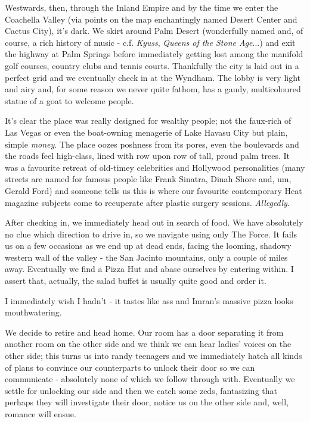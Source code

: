 \documentclass[a5paper,titlepage,11pt]{book}
\begin{document}
Westwards, then, through the Inland Empire and by the time we enter the Coachella Valley (via points on the map enchantingly named Desert Center and Cactus City), it's dark.  We skirt around Palm Desert (wonderfully named and, of course, a rich history of music - c.f. \emph{Kyuss}, \emph{Queens of the Stone Age}...) and exit the highway at Palm Springs before immediately getting lost among the manifold golf courses, country clubs and tennis courts.  Thankfully the city is laid out in a perfect grid and we eventually check in at the Wyndham.  The lobby is very light and airy and, for some reason we never quite fathom, has a gaudy, multicoloured statue of a goat to welcome people.

It's clear the place was really designed for wealthy people; not the faux-rich of Las Vegas or even the boat-owning menagerie of Lake Havasu City but plain, simple \emph{money}.  The place oozes poshness from its pores, even the boulevards and the roads feel high-class, lined with row upon row of tall, proud palm trees.  It was a favourite retreat of old-timey celebrities and Hollywood personalities (many streets are named for famous people like Frank Sinatra, Dinah Shore and, um, Gerald Ford) and someone tells us this is where our favourite contemporary Heat magazine subjects come to recuperate after plastic surgery sessions.  \emph{Allegedly}.

After checking in, we immediately head out in search of food.  We have absolutely no clue which direction to drive in, so we navigate using only The Force.  It fails us on a few occasions as we end up at dead ends, facing the looming, shadowy western wall of the valley - the San Jacinto mountains, only a couple of miles away.  Eventually we find a Pizza Hut and abase ourselves by entering within.  I assert that, actually, the salad buffet is usually quite good and order it.

I immediately wish I hadn't - it tastes like ass and Imran's massive pizza looks mouthwatering.

We decide to retire and head home.  Our room has a door separating it from another room on the other side and we think we can hear ladies' voices on the other side; this turns us into randy teenagers and we immediately hatch all kinds of plans to convince our counterparts to unlock their door so we can communicate - absolutely none of which we follow through with.  Eventually we settle for unlocking our side and then we catch some zeds, fantasizing that perhaps they will investigate their door, notice us on the other side and, well, romance will ensue.
\end{document}
